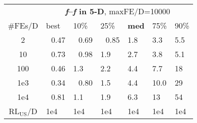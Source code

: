 \begin{tabular}{c|llllll}
 & \multicolumn{6}{|c}{\textbf{\textit{f}\raisebox{-0.35ex}{1}--\textit{f}\raisebox{-0.35ex}{24} in 5-D}, maxFE/D=10000}\\
\#FEs/D & best & 10\% & 25\% & \textbf{med} & 75\% & 90\%\\
2 & ~\,0.47 & ~\,0.69 & ~\,0.85 & \hspace*{1ex}1.8 & \hspace*{1ex}3.3 & \hspace*{1ex}5.5\\
10 & ~\,0.73 & ~\,0.98 & \hspace*{1ex}1.9 & \hspace*{1ex}2.7 & \hspace*{1ex}3.8 & \hspace*{1ex}5.1\\
100 & ~\,0.46 & \hspace*{1ex}1.3 & \hspace*{1ex}2.2 & \hspace*{1ex}4.4 & \hspace*{1ex}7.7 & 18\\
1e3 & ~\,0.34 & ~\,0.80 & \hspace*{1ex}1.5 & \hspace*{1ex}4.4 & \hspace*{1ex}10.0 & 29\\
1e4 & ~\,0.81 & \hspace*{1ex}1.1 & \hspace*{1ex}1.9 & \hspace*{1ex}6.3 & 13 & 54\\
$\text{RL}_{\text{US}}$/D & 1e4 & 1e4 & 1e4 & 1e4 & 1e4 & 1e4
\end{tabular}
